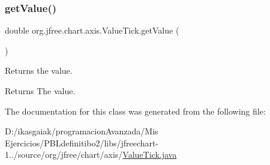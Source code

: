 \subsubsection{\texorpdfstring{get\+Value()}{getValue()}}
{\footnotesize\ttfamily double org.\+jfree.\+chart.\+axis.\+Value\+Tick.\+get\+Value (\begin{DoxyParamCaption}{ }\end{DoxyParamCaption})}

Returns the value.

\begin{DoxyReturn}{Returns}
The value. 
\end{DoxyReturn}


The documentation for this class was generated from the following file\+:\begin{DoxyCompactItemize}
\item 
D\+:/ikasgaiak/programacion\+Avanzada/\+Mis Ejercicios/\+P\+B\+Ldefinitibo2/libs/jfreechart-\/1../source/org/jfree/chart/axis/\mbox{\hyperlink{_value_tick_8java}{Value\+Tick.\+java}}\end{DoxyCompactItemize}
